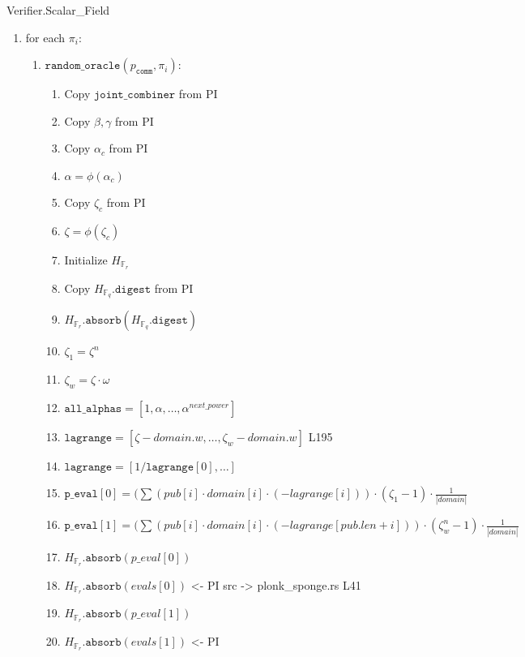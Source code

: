 \begin{algorithm}[H]
\caption{Verifier.Scalar\_Field}
\begin{enumerate}
	\item for each $\pi_i$:
		\begin{enumerate}
			\item $\texttt{random\_oracle}(p_{\texttt{comm}}, \pi_i)$:
            \begin{enumerate}
				\item Copy $\texttt{joint\_combiner}$ from PI
				\item Copy $\beta, \gamma$ from PI
				\item Copy $\alpha_c$ from PI
                \item $\alpha = \phi(\alpha_c)$
				\item Copy $\zeta_c$ from PI
                \item $\zeta = \phi(\zeta_c)$
                \item Initialize $H_{\mathbb{F}_r}$
                \item Copy $H_{\mathbb{F}_q}.\texttt{digest}$ from PI
                \item $H_{\mathbb{F}_r}.\texttt{absorb}(H_{\mathbb{F}_q}.\texttt{digest})$
                \item $\zeta_1 = \zeta^{n}$
                \item $\zeta_w = \zeta \cdot \omega$
				\item $\texttt{all\_alphas} = [1, \alpha, \dots, \alpha^{next\_power}]$
				\item $\texttt{lagrange} = [\zeta - domain.w, \dots, \zeta_w - domain.w]$ L195
				\item $\texttt{lagrange} = [1 / \texttt{lagrange}[0], \dots]$
				\item $\texttt{p\_eval}[0] = (\sum(pub[i] \cdot domain[i] \cdot (-lagrange[i])) 
													\cdot (\zeta_1 - 1) \cdot \frac{1}{|domain|}$
				\item $\texttt{p\_eval}[1] = (\sum(pub[i] \cdot domain[i] \cdot (-lagrange[pub.len + i])) 
													\cdot (\zeta_w^{n} - 1) \cdot \frac{1}{|domain|}$
				\item $H_{\mathbb{F}_r}.\texttt{absorb}(p\_eval[0])$
				\item $H_{\mathbb{F}_r}.\texttt{absorb}(evals[0])$ <- PI src -> plonk\_sponge.rs L41
				\item $H_{\mathbb{F}_r}.\texttt{absorb}(p\_eval[1])$
				\item $H_{\mathbb{F}_r}.\texttt{absorb}(evals[1])$ <- PI

\end{enumerate}
\end{enumerate}
\end{enumerate}
\end{algorithm}
